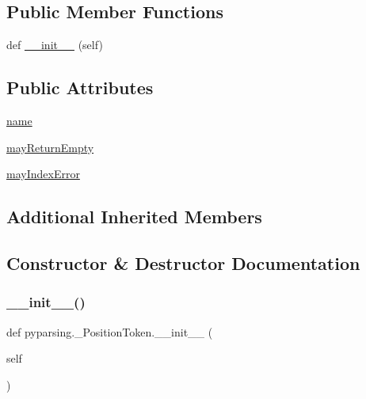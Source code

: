 \subsection*{Public Member Functions}
\begin{DoxyCompactItemize}
\item 
def \hyperlink{classpyparsing_1_1__PositionToken_a36036e1a6ab921289e681da73f0414d6}{\+\_\+\+\_\+init\+\_\+\+\_\+} (self)
\end{DoxyCompactItemize}
\subsection*{Public Attributes}
\begin{DoxyCompactItemize}
\item 
\hyperlink{classpyparsing_1_1__PositionToken_a0b4342490295d4e43ed76e45d3486556}{name}
\item 
\hyperlink{classpyparsing_1_1__PositionToken_aa9d30a876987060bffde845b239178da}{may\+Return\+Empty}
\item 
\hyperlink{classpyparsing_1_1__PositionToken_a4b2f348a3355d681284e930959b877ff}{may\+Index\+Error}
\end{DoxyCompactItemize}
\subsection*{Additional Inherited Members}


\subsection{Constructor \& Destructor Documentation}
\mbox{\label{classpyparsing_1_1__PositionToken_a36036e1a6ab921289e681da73f0414d6}} 
\subsubsection{\texorpdfstring{\+\_\+\+\_\+init\+\_\+\+\_\+()}{\_\_init\_\_()}}
{\footnotesize\ttfamily def pyparsing.\+\_\+\+Position\+Token.\+\_\+\+\_\+init\+\_\+\+\_\+ (\begin{DoxyParamCaption}\item[{}]{self }\end{DoxyParamCaption})}



